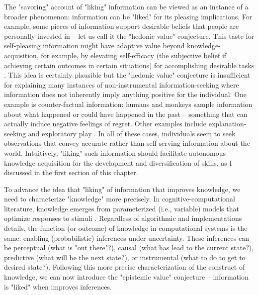 The "savoring" account of "liking" information can be viewed as an instance of a broader phenomenon: information can be "liked" for its pleasing implications. For example, some pieces of information support desirable beliefs that people are personally invested in \cite[e.g., confirmation bias][]{nickerson_confirmation_1998} -- let us call it the "hedonic value" conjecture. This taste for self-pleasing information might have adaptive value beyond knowledge-acquisition, for example, by elevating self-efficacy \cite{bandura_self-efficacy_1977} (the subjective belief if achieving certain outcomes in certain situations) for accomplishing desirable tasks \cite{bromberg-martin_value_2020}. This idea is certainly plausible but the "hedonic value" conjecture is insufficient for explaining many instances of non-instrumental information-seeking where information does not inherently imply anything positive for the individual. One example is counter-factual information: humans \cite{fitzgibbon_lure_2021} and monkeys \cite{wang_monkeys_2019} sample information about what happened or could have happened in the past -- something that can actually induce negative feelings of regret. Other examples include explanation-seeking \cite{coenen_asking_2019,liquin_explanation-seeking_2020} and exploratory play \cite{cook_where_2011,chu_play_2020}. In all of these cases, individuals seem to seek observations that convey accurate rather than self-serving information about the world. Intuitively, "liking" such information should facilitate autonomous knowledge acquisition for the development and diversification of skills, as I discussed in the first section of this chapter.

To advance the idea that "liking" of information that improves knowledge, we need to characterize "knowledge" more precisely. In cognitive-computational literature, knowledge emerges from parameterized (i.e., variable) models that optimize responses to stimuli \cite[e.g., connectionist and probabilistic cognitive models models][]{mcclelland_letting_2010,griffiths_probabilistic_2010}. Regardless of algorithmic and implementations details, the function (or outcome) of knowledge in computational systems is the same: enabling (probabilistic) inferences under uncertainty. These inferences can be perceptual (what is "out there"?), causal (what has lead to the current state?), predictive (what will be the next state?), or instrumental (what to do to get to desired state?). Following this more precise characterization of the construct of knowledge, we can now introduce the "epistemic value" conjecture -- information is "liked" when improves inferences.

